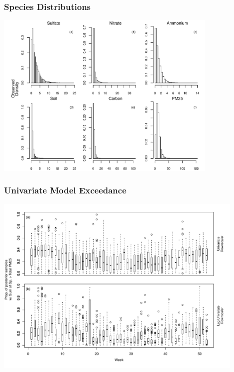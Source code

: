 \documentclass[t]{beamer}\usepackage[]{graphicx}\usepackage[]{color}
\begin{document}
\begin{frame}[label=univ]
\frametitle{Species Distributions}

\vfill
\begin{center}
\includegraphics[width=0.8\textwidth]{figs/pm_hists.pdf}
\end{center}
\vfill

\end{frame}


\begin{frame}[label=univ]
\frametitle{Univariate Model Exceedance}

\vfill
\begin{center}
\includegraphics[width=0.9\textwidth]{figs/pm_exceed_uni.pdf}
\end{center}
\vfill

\end{frame}
\end{document}
